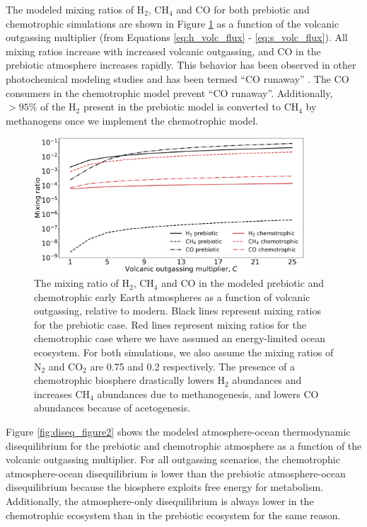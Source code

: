 The modeled mixing ratios of H$_2$, CH$_4$ and CO for both prebiotic and chemotrophic simulations are shown in Figure \ref{fig:diseq_figure1} as a function of the volcanic outgassing multiplier (from Equations \eqref{eq:h_volc_flux} - \eqref{eq:s_volc_flux}). All mixing ratios increase with increased volcanic outgassing, and CO in the prebiotic atmosphere increases rapidly. This behavior has been observed in other photochemical modeling studies and has been termed ``CO runaway'' \citep{Kasting_1983,Zahnle_1986}. The CO consumers in the chemotrophic model prevent ``CO runaway''. Additionally, $> 95\%$ of the H$_2$ present in the prebiotic model is converted to CH$_4$ by methanogens once we implement the chemotrophic model. 

\begin{figure}
  \centering
  \includegraphics[width=0.9\textwidth]{tex/2diseq/Figure1.pdf}
  \caption{The mixing ratio of H$_2$, CH$_4$ and CO in the modeled prebiotic and chemotrophic early Earth atmospheres as a function of volcanic outgassing, relative to modern. Black lines represent mixing ratios for the prebiotic case. Red lines represent mixing ratios for the chemotrophic case where we have assumed an energy-limited ocean ecosystem. For both simulations, we also assume the mixing ratios of N$_2$ and CO$_2$ are 0.75 and 0.2 respectively. The presence of a chemotrophic biosphere drastically lowers H$_2$ abundances and increases CH$_4$ abundances due to methanogenesis, and lowers CO abundances because of acetogenesis.}
  \label{fig:diseq_figure1}
\end{figure}

Figure \ref{fig:diseq_figure2} shows the modeled atmosphere-ocean thermodynamic disequilibrium for the prebiotic and chemotrophic atmosphere as a function of the volcanic outgassing multiplier. For all outgassing scenarios, the chemotrophic atmosphere-ocean disequilibrium is lower than the prebiotic atmosphere-ocean disequilibrium because the biosphere exploits free energy for metabolism. Additionally, the atmosphere-only disequilibrium is always lower in the chemotrophic ecosystem than in the prebiotic ecosystem for the same reason.

